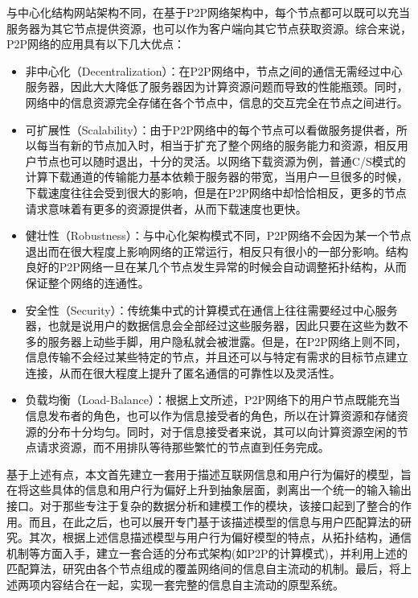 与中心化结构网站架构不同，在基于P2P网络架构中，每个节点都可以既可以充当服务器为其它节点提供资源，也可以作为客户端向其它节点获取资源。综合来说，P2P网络的应用具有以下几大优点\cite{lua2005survey}：

\begin{itemize}
\item 非中心化（Decentralization）：在P2P网络中，节点之间的通信无需经过中心服务器，因此大大降低了服务器因为计算资源问题而导致的性能瓶颈。同时，网络中的信息资源完全存储在各个节点中，信息的交互完全在节点之间进行。
\item 可扩展性（Scalability）：由于P2P网络中的每个节点可以看做服务提供者，所以每当有新的节点加入时，相当于扩充了整个网络的服务能力和资源，相反用户节点也可以随时退出，十分的灵活。以网络下载资源为例，普通C/S模式的计算下载通道的传输能力基本依赖于服务器的带宽，当用户一旦很多的时候，下载速度往往会受到很大的影响，但是在P2P网络中却恰恰相反，更多的节点请求意味着有更多的资源提供者，从而下载速度也更快。
\item 健壮性（Robustness）：与中心化架构模式不同，P2P网络不会因为某一个节点退出而在很大程度上影响网络的正常运行，相反只有很小的一部分影响。结构良好的P2P网络一旦在某几个节点发生异常的时候会自动调整拓扑结构，从而保证整个网络的连通性。
\item 安全性（Security）：传统集中式的计算模式在通信上往往需要经过中心服务器，也就是说用户的数据信息会全部经过这些服务器，因此只要在这些为数不多的服务器上动些手脚，用户隐私就会被泄露。但是，在P2P网络上则不同，信息传输不会经过某些特定的节点，并且还可以与特定有需求的目标节点建立连接，从而在很大程度上提升了匿名通信的可靠性以及灵活性。
\item 负载均衡（Load-Balance）：根据上文所述，P2P网络下的用户节点既能充当信息发布者的角色，也可以作为信息接受者的角色，所以在计算资源和存储资源的分布十分均匀。同时，对于信息接受者来说，其可以向计算资源空闲的节点请求资源，而不用排队等待那些繁忙的节点直到任务完成。
\end{itemize}

基于上述有点，本文首先建立一套用于描述互联网信息和用户行为偏好的模型，旨在将这些具体的信息和用户行为偏好上升到抽象层面，剥离出一个统一的输入输出接口。对于那些专注于复杂的数据分析和建模工作的模块，该接口起到了整合的作用。而且，在此之后，也可以展开专门基于该描述模型的信息与用户匹配算法的研究。其次，根据上述信息描述模型与用户行为偏好模型的特点，从拓扑结构，通信机制等方面入手，建立一套合适的分布式架构(如P2P的计算模式)，并利用上述的匹配算法，研究由各个节点组成的覆盖网络间的信息自主流动的机制。最后，将上述两项内容结合在一起，实现一套完整的信息自主流动的原型系统。

